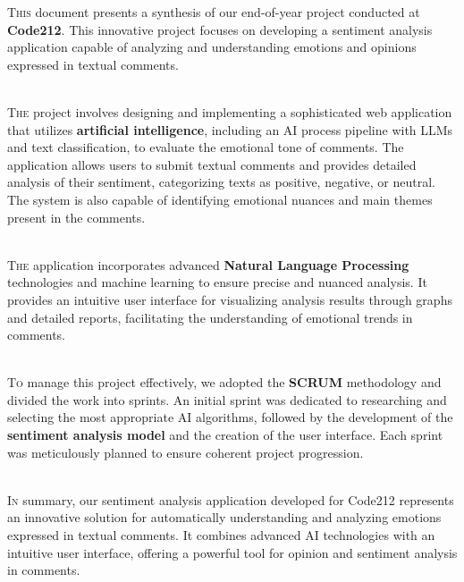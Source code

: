 
\lettrine[nindent=0em, slope=.5em] {\color{Eblue}T}{his} document presents a synthesis of our end-of-year project conducted at \textbf{Code212}. This innovative project focuses on developing a sentiment analysis application capable of analyzing and understanding emotions and opinions expressed in textual comments.

\ \\

\lettrine[nindent=0em, slope=.5em] {\color{Eblue}T}{he} project involves designing and implementing a sophisticated web application that utilizes \textbf{artificial intelligence}, including an AI process pipeline with LLMs and text classification, to evaluate the emotional tone of comments. The application allows users to submit textual comments and provides detailed analysis of their sentiment, categorizing texts as positive, negative, or neutral. The system is also capable of identifying emotional nuances and main themes present in the comments.

\ \\

\lettrine[nindent=0em, slope=.5em] {\color{Eblue}T}{he} application incorporates advanced \textbf{Natural Language Processing} technologies and machine learning to ensure precise and nuanced analysis. It provides an intuitive user interface for visualizing analysis results through graphs and detailed reports, facilitating the understanding of emotional trends in comments.

\ \\

\lettrine[nindent=0em, slope=.5em] {\color{Eblue}T}{o} manage this project effectively, we adopted the \textbf{SCRUM} methodology and divided the work into sprints. An initial sprint was dedicated to researching and selecting the most appropriate AI algorithms, followed by the development of the \textbf{sentiment analysis model} and the creation of the user interface. Each sprint was meticulously planned to ensure coherent project progression.

\ \\

\lettrine[nindent=0em, slope=.5em] {\color{Eblue}I}{n} summary, our sentiment analysis application developed for Code212 represents an innovative solution for automatically understanding and analyzing emotions expressed in textual comments. It combines advanced AI technologies with an intuitive user interface, offering a powerful tool for opinion and sentiment analysis in comments.
